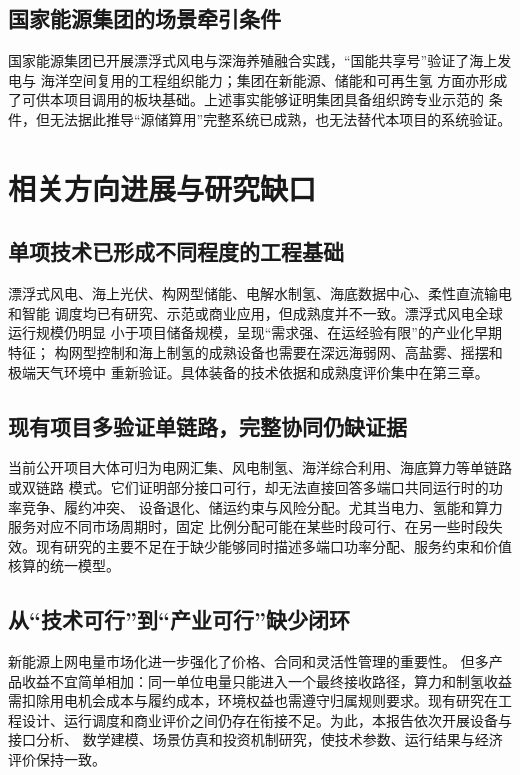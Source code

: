 \subsection{国家能源集团的场景牵引条件}

国家能源集团已开展漂浮式风电与深海养殖融合实践，“国能共享号”验证了海上发电与
海洋空间复用的工程组织能力\cite{chnenergy-sharing}；集团在新能源、储能和可再生氢
方面亦形成了可供本项目调用的板块基础。上述事实能够证明集团具备组织跨专业示范的
条件，但无法据此推导“源储算用”完整系统已成熟，也无法替代本项目的系统验证。

\section{相关方向进展与研究缺口}

\subsection{单项技术已形成不同程度的工程基础}

漂浮式风电、海上光伏、构网型储能、电解水制氢、海底数据中心、柔性直流输电和智能
调度均已有研究、示范或商业应用，但成熟度并不一致。漂浮式风电全球运行规模仍明显
小于项目储备规模，呈现“需求强、在运经验有限”的产业化早期特征\cite{irena-floating}；
构网型控制和海上制氢的成熟设备也需要在深远海弱网、高盐雾、摇摆和极端天气环境中
重新验证。具体装备的技术依据和成熟度评价集中在第三章。

\subsection{现有项目多验证单链路，完整协同仍缺证据}

当前公开项目大体可归为电网汇集、风电制氢、海洋综合利用、海底算力等单链路或双链路
模式。它们证明部分接口可行，却无法直接回答多端口共同运行时的功率竞争、履约冲突、
设备退化、储运约束与风险分配。尤其当电力、氢能和算力服务对应不同市场周期时，固定
比例分配可能在某些时段可行、在另一些时段失效。现有研究的主要不足在于缺少能够同时描述多端口功率分配、服务约束和价值核算的统一模型。

\subsection{从“技术可行”到“产业可行”缺少闭环}

新能源上网电量市场化进一步强化了价格、合同和灵活性管理的重要性\cite{ndrc-price}。
但多产品收益不宜简单相加：同一单位电量只能进入一个最终接收路径，算力和制氢收益
需扣除用电机会成本与履约成本，环境权益也需遵守归属规则要求。现有研究在工程设计、运行调度和商业评价之间仍存在衔接不足。为此，本报告依次开展设备与接口分析、
数学建模、场景仿真和投资机制研究，使技术参数、运行结果与经济评价保持一致。

